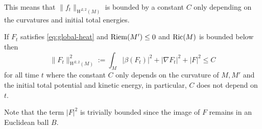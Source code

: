This means that \(\|f_t\|_{W^{2,2}(M)}\) is bounded by a constant \(C\) only depending
on the curvatures and initial total energies.


\begin{corollary}[Boundedness in \( W^{2,2}(M) \)]
\label{cor:bound-2-2}
If \(F_t\) satisfies \eqref{eq:global-heat} and \(\mathop{\rm Riem}\nolimits(M')\leq 0\) and \(\mathop{\rm Ric}\nolimits(M)\)
is bounded below then
\[
\|F_t\|^2_{W^{2,2}(M)} := \int_M | \beta(F_t)|^2 + |\nabla F_t|^2 +|F|^2 \leq C
\]
for all time \(t\) where the constant \(C\) only depends on the curvature of \(M, M'\) and the initial total potential and kinetic energy, in particular, \(C\) does not depend on \(t\).
\end{corollary}

Note that the term \(|F|^2\) is trivially bounded since the image of \(F\) remains in
an Euclidean ball \(B\).

